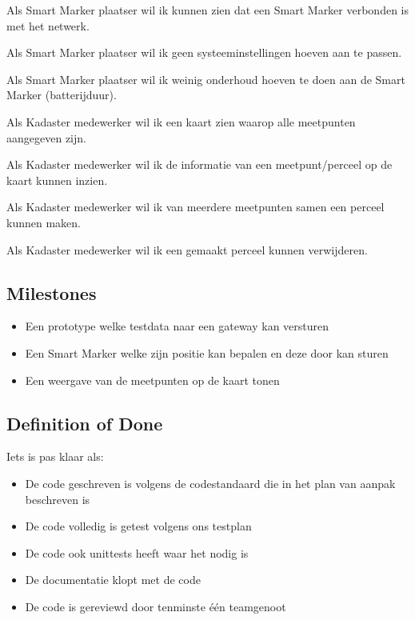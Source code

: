 \story
Als Smart Marker plaatser wil ik kunnen zien dat een Smart Marker verbonden
is met het netwerk.

\story
Als Smart Marker plaatser wil ik geen systeeminstellingen hoeven aan te passen.

\story
Als Smart Marker plaatser wil ik weinig onderhoud hoeven te doen aan de
Smart Marker (batterijduur).

\story
Als Kadaster medewerker wil ik een kaart zien waarop alle meetpunten aangegeven zijn.

\story
Als Kadaster medewerker wil ik de informatie van een meetpunt/perceel op de kaart kunnen inzien.

\story
Als Kadaster medewerker wil ik van meerdere meetpunten samen een perceel kunnen maken.

\story
Als Kadaster medewerker wil ik een gemaakt perceel kunnen verwijderen.

\newpage
\subsection{Milestones}
\begin{itemize}
    \item Een prototype welke testdata naar een gateway kan versturen
    \item Een Smart Marker welke zijn positie kan bepalen en deze door kan sturen
    \item Een weergave van de meetpunten op de kaart tonen
\end{itemize}
\subsection{Definition of Done}
Iets is pas klaar als:
\begin{itemize}
    \item De code geschreven is volgens de codestandaard die in het plan
          van aanpak beschreven is\
    \item De code volledig is getest volgens ons testplan
    \item De code ook unittests heeft waar het nodig is
    \item De documentatie klopt met de code
    \item De code is gereviewd door tenminste één teamgenoot
\end{itemize}
